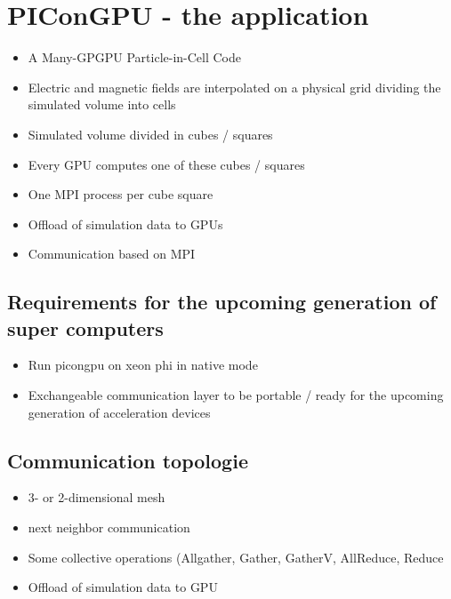\section{PIConGPU - the application}
\label{sec:picongpu}
\begin{itemize}
  \item A Many-GPGPU Particle-in-Cell Code
  \item Electric and magnetic fields are interpolated on a physical
    grid dividing the simulated volume into cells
  \item Simulated volume divided in cubes / squares
  \item Every GPU computes one of these cubes / squares
  \item One MPI process per cube square
  \item Offload of simulation data to GPUs
  \item Communication based on MPI
\end{itemize}

\subsection{Requirements for the upcoming generation of super computers}
\begin{itemize}
\item Run picongpu on xeon phi in native mode
\item Exchangeable communication layer to be portable / ready  for the upcoming
  generation of acceleration devices
\end{itemize}

\subsection{Communication topologie}
\begin{itemize}
\item 3- or 2-dimensional mesh
\item next neighbor communication
\item Some collective operations (Allgather, Gather, GatherV, AllReduce, Reduce
\item Offload of simulation data to GPU
\end{itemize}


\cleardoublepage

